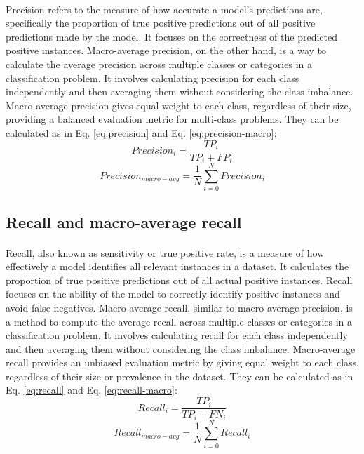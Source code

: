 \paragraph{}
Precision refers to the measure of how accurate a model's predictions are, specifically the proportion of true positive predictions out of all positive predictions made by the model. It focuses on the correctness of the predicted positive instances. Macro-average precision, on the other hand, is a way to calculate the average precision across multiple classes or categories in a classification problem. It involves calculating precision for each class independently and then averaging them without considering the class imbalance. Macro-average precision gives equal weight to each class, regardless of their size, providing a balanced evaluation metric for multi-class problems. They can be calculated as in Eq. \ref{eq:precision} and Eq. \ref{eq:precision-macro}:
\begin{equation}
	Precision_i = \frac{TP_i}{TP_i + FP_i}
	\label{eq:precision}
\end{equation}
\begin{equation}
	Precision_{macro-avg} = \frac{1}{N}  \sum_{i=0}^{N} Precision_i 
	\label{eq:precision-macro}
\end{equation}
\subsection{Recall and macro-average recall}
\paragraph{}
Recall, also known as sensitivity or true positive rate, is a measure of how effectively a model identifies all relevant instances in a dataset. It calculates the proportion of true positive predictions out of all actual positive instances. Recall focuses on the ability of the model to correctly identify positive instances and avoid false negatives. Macro-average recall, similar to macro-average precision, is a method to compute the average recall across multiple classes or categories in a classification problem. It involves calculating recall for each class independently and then averaging them without considering the class imbalance. Macro-average recall provides an unbiased evaluation metric by giving equal weight to each class, regardless of their size or prevalence in the dataset. They can be calculated as in Eq. \ref{eq:recall} and Eq. \ref{eq:recall-macro}:
\begin{equation}
	Recall_i = \frac{TP_i}{TP_i + FN_i}
	\label{eq:recall}
\end{equation}
\begin{equation}
	Recall_{macro-avg} = \frac{1}{N}  \sum_{i=0}^{N} Recall_i
	\label{eq:recall-macro}
\end{equation}

